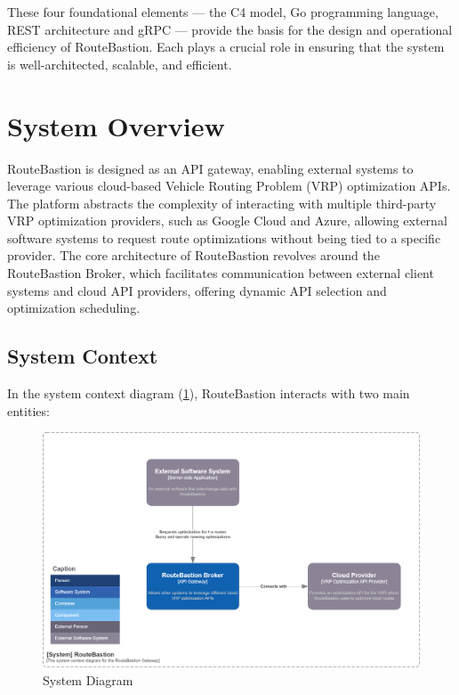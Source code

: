 \documentclass[english,notblind]{sbc20}
\begin{document}
These four foundational elements — the C4 model, Go programming language, REST architecture and gRPC — provide the basis for the design and operational efficiency of RouteBastion. Each plays a crucial role in ensuring that the system is well-architected, scalable, and efficient.

\section{System Overview}
\label{sec:system_overview}
RouteBastion is designed as an API gateway, enabling external systems to leverage various cloud-based Vehicle Routing Problem (VRP) optimization APIs. The platform abstracts the complexity of interacting with multiple third-party VRP optimization providers, such as Google Cloud and Azure, allowing external software systems to request route optimizations without being tied to a specific provider. The core architecture of RouteBastion revolves around the RouteBastion Broker, which facilitates communication between external client systems and cloud API providers, offering dynamic API selection and optimization scheduling.

\subsection{System Context}
\label{subsec:system_context}
In the system context diagram (\ref{fig:system}), RouteBastion interacts with two main entities:

\begin{figure}
  \includegraphics[width=\columnwidth]{figures/c4_diagrams/System.png}
  \caption{System Diagram\label{fig:system}}
\end{figure}
\end{document}
